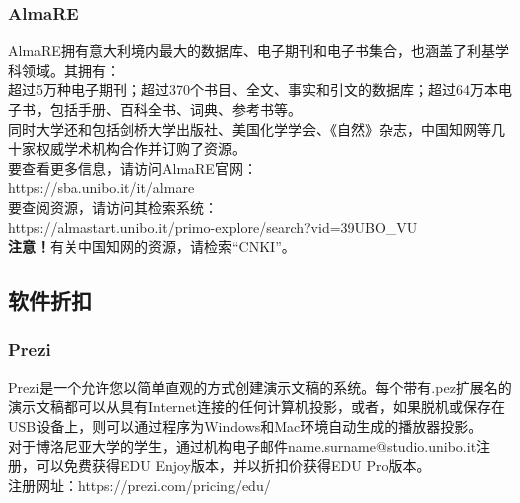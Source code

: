 \subsubsection{AlmaRE}
AlmaRE拥有意大利境内最大的数据库、电子期刊和电子书集合，也涵盖了利基学科领域。其拥有：\\
超过5万种电子期刊；超过370个书目、全文、事实和引文的数据库；超过64万本电子书，包括手册、百科全书、词典、参考书等。\\
同时大学还和包括剑桥大学出版社、美国化学学会、《自然》杂志，中国知网等几十家权威学术机构合作并订购了资源。\\
要查看更多信息，请访问AlmaRE官网：\\
https://sba.unibo.it/it/almare\\
要查阅资源，请访问其检索系统：\\
https://almastart.unibo.it/primo-explore/search?vid=39UBO\_VU\\
\textbf{注意！}有关中国知网的资源，请检索“CNKI”。

\subsection{软件折扣}
\subsubsection{Prezi}
Prezi是一个允许您以简单直观的方式创建演示文稿的系统。每个带有.pez扩展名的演示文稿都可以从具有Internet连接的任何计算机投影，或者，如果脱机或保存在USB设备上，则可以通过程序为Windows和Mac环境自动生成的播放器投影。\\
对于博洛尼亚大学的学生，通过机构电子邮件name.surname@studio.unibo.it注册，可以免费获得EDU Enjoy版本，并以折扣价获得EDU Pro版本。\\
注册网址：https://prezi.com/pricing/edu/

